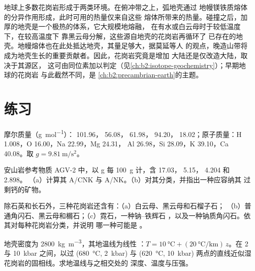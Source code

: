 地球上多数花岗岩形成于两类环境。在俯冲带之上，弧地壳通过
地幔镁铁质熔体的分异作用形成，此时可用的热量仅来自这些
熔体所带来的热量。碰撞之后，加厚的地壳是一个极热的体系，它大规模地熔融，
在有水或白云母时于较低温度下，在较高温度下
靠黑云母分解，这些源自地壳的花岗岩再循环了
已存在的地壳。地幔熔体也在此处抵达地壳，其量足够大，据莫延等人
的观点，晚造山带将成为地壳生长的重要贡献者。因此，花岗岩究竟是增加
大陆还是仅改造大陆，取决于其源区，
这可由同位素加以判定（见\cref{ch:b2:isotope-geochemistry}）；早期地球的花岗岩
与此截然不同，是
\cref{ch:b2:precambrian-earth}的主题。

\section{练习}\label{sec:b2:crustal-melting:exercises}

摩尔质量（\unit{\gram\per\mole}）： 101.96， 56.08， 61.98，
 94.20， 18.02；原子质量：H 1.008，O 16.00，Na 22.99，Mg 24.31，
Al 26.98，Si 28.09，K 39.10，Ca 40.08。取 $g = \qty{9.81}{\metre\per\second\squared}$。

\begin{exercise}[$\star$]\label{exo:b2:crustal-melting:1}
安山岩参考物质 AGV-2 中，以 \unit{\gram} 每 \qty{100}{\gram} 计，含
 17.03， 5.15， 4.204 和  2.898。
（a）计算其 A/CNK 与 A/NK。（b）对其分类，并指出一种应容纳其
过剩钙的矿物。
\end{exercise}

\begin{exercise}[$\star$]\label{exo:b2:crustal-melting:2}
除石英和长石外，三种花岗岩还含有：（a）白云母、黑云母和石榴子石；
（b）普通角闪石、黑云母和榍石；（c）霓石，一种钠–铁辉石
，以及一种钠质角闪石。依其对每种花岗岩分类，并说明
哪一种可能是 。
\end{exercise}

\begin{exercise}[$\star$]\label{exo:b2:crustal-melting:3}
地壳密度为 \qty{2800}{\kilogram\per\cubic\metre}，其地温线为线性
：$T = \qty{10}{\celsius} + (\qty{20}{\celsius\per\kilo\metre})\,z$。在 2 与
\qty{10}{kbar} 之间，以过
(\qty{680}{\celsius}, \qty{2}{kbar}) 与 (\qty{620}{\celsius}, \qty{10}{kbar}) 两点的直线近似湿花岗岩的固相线。求地温线与之相交处的
深度、温度与压强。
\end{exercise}

